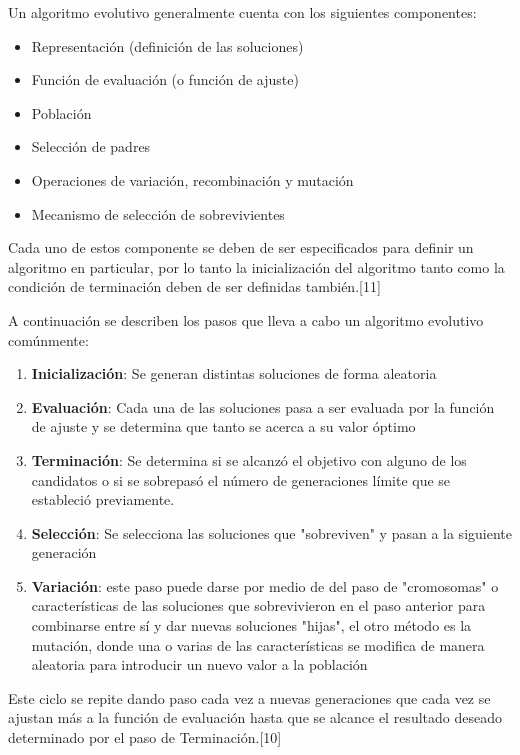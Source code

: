 Un algoritmo evolutivo generalmente cuenta con los siguientes componentes:

\begin{itemize}
\item Representación (definición de las soluciones)
\item Función de evaluación (o función de ajuste)
\item Población
\item Selección de padres
\item Operaciones de variación, recombinación y mutación
\item Mecanismo de selección de sobrevivientes 
\end{itemize}


Cada uno de estos componente se deben de ser especificados para definir un algoritmo en particular, por lo tanto la inicialización del algoritmo tanto como la condición de terminación deben de ser definidas también.[11]

A continuación se describen los pasos que lleva a cabo un algoritmo evolutivo comúnmente:

\begin{enumerate}
\item \textbf{Inicialización}: Se generan distintas soluciones de forma aleatoria
\item \textbf{Evaluación}: Cada una de las soluciones pasa a ser evaluada por la función de ajuste y se determina que tanto se acerca a su valor óptimo
\item \textbf{Terminación}: Se determina si se alcanzó el objetivo con alguno de los candidatos o si se sobrepasó el número de generaciones límite que se estableció previamente.
\item \textbf{Selección}: Se selecciona las soluciones que "sobreviven" y pasan a la siguiente generación
\item \textbf{Variación}: este paso puede darse por medio de del paso de "cromosomas" o características de las soluciones que sobrevivieron en el paso anterior para combinarse entre sí y dar nuevas soluciones "hijas", el otro método es la mutación, donde una o varias de las características se modifica de manera aleatoria para introducir un nuevo valor a la población
\end{enumerate}

Este ciclo se repite dando paso cada vez a nuevas generaciones que cada vez se ajustan más a la función de evaluación hasta que se alcance el resultado deseado determinado por el paso de Terminación.[10] \\

